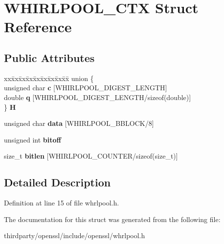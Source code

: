 \hypertarget{struct_w_h_i_r_l_p_o_o_l___c_t_x}{}\section{W\+H\+I\+R\+L\+P\+O\+O\+L\+\_\+\+C\+TX Struct Reference}
\label{struct_w_h_i_r_l_p_o_o_l___c_t_x}
\subsection*{Public Attributes}
\begin{DoxyCompactItemize}
\item 
\mbox{\label{struct_w_h_i_r_l_p_o_o_l___c_t_x_ad605c8db133350f6721827cc4a03b3a6}} 
\begin{tabbing}
xx\=xx\=xx\=xx\=xx\=xx\=xx\=xx\=xx\=\kill
union \{\\
\>unsigned char {\bfseries c} \mbox{[}WHIRLPOOL\_DIGEST\_LENGTH\mbox{]}\\
\>double {\bfseries q} \mbox{[}WHIRLPOOL\_DIGEST\_LENGTH/sizeof(double)\mbox{]}\\
\} {\bfseries H}\\

\end{tabbing}\item 
\mbox{\label{struct_w_h_i_r_l_p_o_o_l___c_t_x_ab580a848108e15b30239c9374c53caa7}} 
unsigned char {\bfseries data} \mbox{[}W\+H\+I\+R\+L\+P\+O\+O\+L\+\_\+\+B\+B\+L\+O\+CK/8\mbox{]}
\item 
\mbox{\label{struct_w_h_i_r_l_p_o_o_l___c_t_x_a9af51a2a30f80139879b0f8a52ef08f0}} 
unsigned int {\bfseries bitoff}
\item 
\mbox{\label{struct_w_h_i_r_l_p_o_o_l___c_t_x_acdb67c455ec2f1ecd07e27e8419b03e0}} 
size\+\_\+t {\bfseries bitlen} \mbox{[}W\+H\+I\+R\+L\+P\+O\+O\+L\+\_\+\+C\+O\+U\+N\+T\+ER/sizeof(size\+\_\+t)\mbox{]}
\end{DoxyCompactItemize}


\subsection{Detailed Description}


Definition at line 15 of file whrlpool.\+h.



The documentation for this struct was generated from the following file\+:\begin{DoxyCompactItemize}
\item 
thirdparty/openssl/include/openssl/whrlpool.\+h\end{DoxyCompactItemize}
